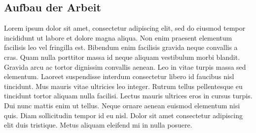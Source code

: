 \subsection{Aufbau der Arbeit}
Lorem ipsum dolor sit amet, consectetur adipiscing elit, sed do eiusmod tempor incididunt ut labore et dolore magna aliqua. Non enim praesent elementum facilisis leo vel fringilla est. Bibendum enim facilisis gravida neque convallis a cras. Quam nulla porttitor massa id neque aliquam vestibulum morbi blandit. Gravida arcu ac tortor dignissim convallis aenean. Leo in vitae turpis massa sed elementum. Laoreet suspendisse interdum consectetur libero id faucibus nisl tincidunt. Mus mauris vitae ultricies leo integer. Rutrum tellus pellentesque eu tincidunt tortor aliquam nulla facilisi. Lectus mauris ultrices eros in cursus turpis. Dui nunc mattis enim ut tellus. Neque ornare aenean euismod elementum nisi quis. Diam sollicitudin tempor id eu nisl. Dolor sit amet consectetur adipiscing elit duis tristique. Metus aliquam eleifend mi in nulla posuere.
\newpage
